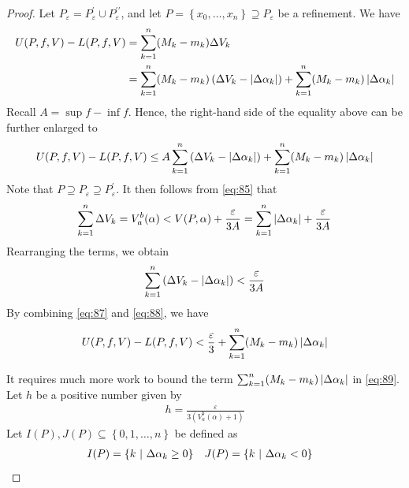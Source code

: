 \documentclass[thmcnt=section, 12pt]{my-elegantbook}
\begin{document}
\begin{proof}
    \par Let $P_\varepsilon = P^\prime_\varepsilon \cup P^{\prime\prime}_\varepsilon$, and let $P = \left\{x_0, \ldots, x_n\right\} \supseteq P_\varepsilon$ be a refinement. We have 
    \begin{align*}
        U(P,f,V) - L(P,f,V)
        &= \sum_{k=1}^n (M_k - m_k) \Delta V_k \\ 
        &= \sum_{k=1}^n (M_k - m_k) \left( \Delta V_k - \left\lvert \Delta\alpha_k \right\rvert \right)
        + \sum_{k=1}^n (M_k - m_k) \left\lvert \Delta\alpha_k \right\rvert
    \end{align*}
    Recall $A = \sup f - \inf f$. Hence, the right-hand side of the equality above can be further enlarged to
    \begin{align}
        U(P,f,V) - L(P,f,V)
        \leq A \sum_{k=1}^n \left( \Delta V_k - \left\lvert \Delta\alpha_k \right\rvert \right)
        + \sum_{k=1}^n (M_k - m_k) \left\lvert \Delta\alpha_k \right\rvert
        \label{eq:87}
    \end{align}
    Note that $P \supseteq P_\varepsilon \supseteq P^\prime_\varepsilon$. It then follows from \eqref{eq:85} that 
    \begin{align*}
        \sum_{k=1}^n \Delta V_k
        = V_a^b(\alpha) 
        < V(P, \alpha)
        + \frac{\varepsilon}{3A}
        = \sum_{k=1}^n \left\lvert \Delta\alpha_k \right\rvert
        + \frac{\varepsilon}{3A}
    \end{align*}
    Rearranging the terms, we obtain 
    \begin{align}
        \sum_{k=1}^n \left( \Delta V_k - \left\lvert \Delta\alpha_k \right\rvert \right)
        < \frac{\varepsilon}{3A}
        \label{eq:88}
    \end{align}
    By combining \eqref{eq:87} and \eqref{eq:88}, we have 
    \begin{align}
        U(P,f,V) - L(P,f,V)
        < \frac{\varepsilon}{3}
        + \sum_{k=1}^n (M_k - m_k) \left\lvert \Delta\alpha_k \right\rvert
        \label{eq:89}
    \end{align}

    It requires much more work to bound the term $\sum_{k=1}^n (M_k - m_k) \left\lvert \Delta\alpha_k \right\rvert$ in \eqref{eq:89}. Let $h$ be a positive number given by 
    \begin{align*}
        h = \frac{\varepsilon}{3(V_a^b (\alpha) + 1)}
    \end{align*}
    Let $I(P), J(P) \subseteq \left\{0, 1, \ldots, n\right\}$ be defined as 
    \begin{align*}
        I(P) &= \left\{ k \ \middle| \ \Delta\alpha_k \geq 0 \right\} & 
        J(P) &= \left\{ k \ \middle| \ \Delta\alpha_k < 0 \right\}
    \end{align*}


\end{proof}
\end{document}
